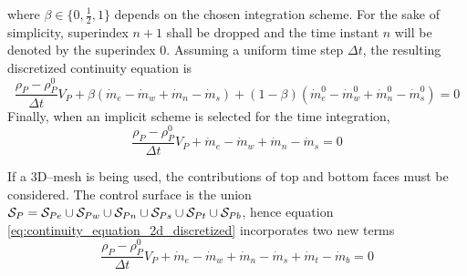 where $\beta \in \{ 0, \frac{1}{2}, 1 \}$ depends on the chosen integration scheme. For the sake of simplicity, superindex $n+1$ shall be dropped and the time instant $n$ will be denoted by the superindex $0$. Assuming a uniform time step $\Delta t$, the resulting discretized continuity equation is
\begin{equation}
	\frac{\rho_P - \rho_P^0}{\Delta t} V_P 
	+ \beta (\dot{m}_e - \dot{m}_w + \dot{m}_n - \dot{m}_s)
	+ (1 - \beta) (\dot{m}_e^0 - \dot{m}_w^0 + \dot{m}_n^0 - \dot{m}_s^0) = 0
\end{equation}
Finally, when an implicit scheme is selected for the time integration,
\begin{equation} \label{eq:continuity_equation_2d_discretized}
	\frac{\rho_P - \rho_P^0}{\Delta t} V_P + 
	\dot{m}_e - \dot{m}_w + 
	\dot{m}_n - \dot{m}_s = 0
\end{equation}

If a 3D--mesh is being used, the contributions of top and bottom faces must be considered. The control surface is the union $\mathcal{S}_{P} = \mathcal{S}_{Pe} \cup \mathcal{S}_{Pw} \cup \mathcal{S}_{Pn} \cup \mathcal{S}_{Ps} \cup \mathcal{S}_{Pt} \cup \mathcal{S}_{Pb}$, hence equation \eqref{eq:continuity_equation_2d_discretized} incorporates two new terms
\begin{equation} \label{eq:continuity_equation_3d_discretized}
	\frac{\rho_P - \rho_P^0}{\Delta t} V_P + 
	\dot{m}_e - \dot{m}_w + \dot{m}_n - \dot{m}_s + \dot{m}_t - \dot{m}_b = 0
\end{equation}










